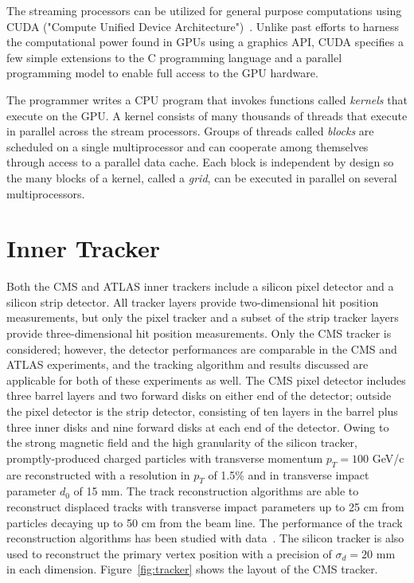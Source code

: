 \documentclass{JINST}
\begin{document}
The streaming processors can be utilized for general purpose computations using
CUDA ("Compute Unified Device Architecture")~\cite{bib:CUDA}.  Unlike past efforts to harness
the computational power found in GPUs using a graphics API, CUDA specifies a
few simple extensions to the C programming language and a parallel programming
model to enable full access to the GPU hardware.

The programmer writes a CPU program that invokes functions called {\it kernels}
that execute on the GPU.  A kernel consists of many thousands of threads that
execute in parallel across the stream processors.  Groups of threads called
{\it blocks} are scheduled on a single multiprocessor and can cooperate among
themselves through access to a parallel data cache.  Each block is independent
by design so the many blocks of a kernel, called a {\it grid}, can be executed
in parallel on several multiprocessors.

\section{Inner Tracker}

Both the CMS and ATLAS inner trackers include a silicon pixel detector and a silicon strip detector.
All tracker layers provide two-dimensional hit position measurements, but only the pixel tracker
 and a subset of the strip tracker layers provide three-dimensional hit position measurements.
Only the CMS tracker is considered; however, the detector performances are comparable
in the CMS and ATLAS experiments, and the tracking algorithm and results discussed are applicable for both of 
these experiments as well. The CMS pixel detector includes three barrel layers and two forward disks
on either end of the detector; outside the pixel detector is the strip detector, consisting of ten layers in the barrel plus three 
inner disks and nine forward disks at each end of the detector.
Owing to the strong magnetic field and the high granularity of the silicon tracker, 
promptly-produced charged particles with transverse momentum $p_T = 100$ GeV/c are reconstructed 
with a resolution in $p_T$ of 1.5\% and in transverse impact
parameter $d_0$ of 15 mm. The track reconstruction algorithms are able to reconstruct displaced
tracks with transverse impact parameters up to 25 cm from particles decaying up to 50 cm
from the beam line. The performance of the track reconstruction algorithms has been studied
with data~\cite{Khachatryan:2010pw}. The silicon tracker is also used to reconstruct the primary vertex position with
 a precision of $\sigma_d = 20$ mm in each dimension. Figure~\ref{fig:tracker} shows the layout of the CMS tracker.
\end{document}
